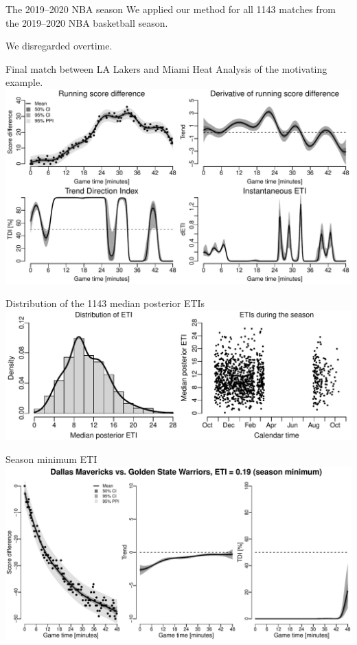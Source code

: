 \documentclass[ignorenonframetext,xcolor=pdflatex,table,dvipsnames,serif]{beamer}
\begin{document}
\begin{frame}{The 2019--2020 NBA season}
We applied our method for all 1143 matches from the 2019--2020 NBA basketball season.

We disregarded overtime.
\end{frame}

\begin{frame}{Final match between LA Lakers and Miami Heat}
Analysis of the motivating example.
\includegraphics[scale=0.5]{fig2.pdf}
\end{frame}

\begin{frame}{Distribution of the 1143 median posterior ETIs}
\includegraphics[scale=0.5]{fig3.pdf}
\end{frame}

\begin{frame}{Season minimum ETI}
\includegraphics[scale=0.5]{fig4_1.pdf}
\end{frame}
\end{document}
